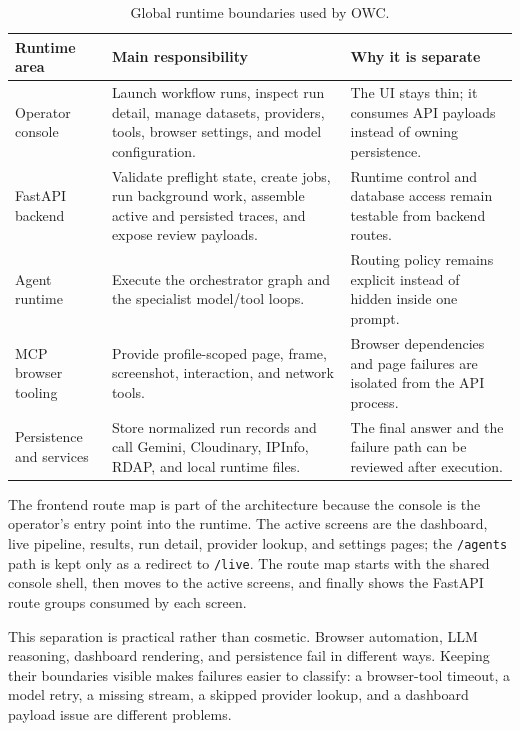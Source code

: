 

\begin{table}[!htbp]
\centering
\begin{tabularx}{\textwidth}{Q{3.15cm} Y Y}
\toprule
{}
Runtime area & Main responsibility & Why it is separate \\
\midrule
Operator console & Launch workflow runs, inspect run detail, manage datasets,
providers, tools, browser settings, and model configuration. & The UI stays
thin; it consumes API payloads instead of owning persistence. \\
FastAPI backend & Validate preflight state, create jobs, run background work,
assemble active and persisted traces, and expose review payloads. & Runtime
control and database access remain testable from backend routes. \\
Agent runtime & Execute the orchestrator graph and the specialist model/tool
loops. & Routing policy remains explicit instead of hidden inside one prompt. \\
MCP browser tooling & Provide profile-scoped page, frame, screenshot,
interaction, and network tools. & Browser dependencies and page failures are
isolated from the API process. \\
Persistence and services & Store normalized run records and call Gemini,
Cloudinary, IPInfo, RDAP, and local runtime files. & The final answer and the
failure path can be reviewed after execution. \\
\bottomrule
\end{tabularx}
\caption{Global runtime boundaries used by OWC.}\label{tab:global-runtime-boundaries}
\end{table}

The frontend route map is part of the architecture because the console is the
operator's entry point into the runtime. The active screens are the dashboard,
live pipeline, results, run detail, provider lookup, and settings pages; the
\texttt{/agents} path is kept only as a redirect to \texttt{/live}.
The route map starts with the shared console shell, then moves to the active screens,
and finally shows the FastAPI route groups consumed by each screen.



This separation is practical rather than cosmetic. Browser automation, LLM
reasoning, dashboard rendering, and persistence fail in different ways. Keeping
their boundaries visible makes failures easier to classify: a browser-tool
timeout, a model retry, a missing stream, a skipped provider lookup, and a
dashboard payload issue are different problems.

